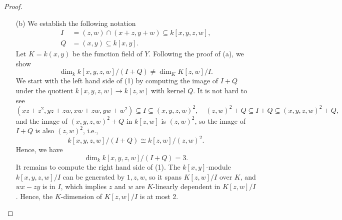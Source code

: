 \documentclass[a4paper]{article}
\begin{document}
\begin{enumerate} [label=\textbf{\arabic*.}, leftmargin=0em]
\begin{proof}
\begin{itemize} [leftmargin=0cm]
                  Since $A$ is a regular local ring, there exist $n$ elements $x_1, \dots, x_n \in A$ that form a minimal set of generators of $\goth{m}$ and an $A$-regular sequence for $A$.
                  Viewing $x_1, \dots, x_n$ as elements in $B_\goth{n}$, the elements $x_1, \dots, x_n$ generate the extension of $\goth{m}$ in $B$, so $B_\goth{n} / (x_1, \dots, x_n) \cong B_\goth{n} / \goth{m}B_\goth{n}$, which is an Artin local ring (A.M., 5.8) and has Krull dimension equal to zero.
                  Thus, $x_1, \dots, x_n$ is the desired $B_\goth{n}$-regular sequence for $B_\goth{n}$.

            \item[(b)] We establish the following notation
                  \begin{align*}
                    I & = (z, w) \cap (x + z, y + w) \subseteq k[x, y, z, w], \\
                    Q & = (x, y) \subseteq k[x, y].
                  \end{align*}
                  Let $K = k(x, y)$ be the function field of $Y$.
                  Following the proof of (a), we show
                  \begin{equation}
                    \dim_k k[x, y, z, w]/(I + Q) \neq \dim_K K[z, w]/I.
                  \end{equation}
                  We start with the left hand side of (1) by computing the image of $I + Q$ under the quotient $k[x, y, z, w] \to k[z, w]$ with kernel $Q$.
                  It is not hard to see
                  \begin{equation*}
                    (xz + z^2, yz + zw, xw + zw, yw + w^2) \subseteq I \subseteq (x, y, z, w)^2, \quad (z, w)^2 + Q \subseteq I + Q \subseteq (x, y, z, w)^2 + Q,
                  \end{equation*}
                  and the image of $(x, y, z, w)^2 + Q$ in $k[z, w]$ is $(z, w)^2$, so the image of $I + Q$ is also $(z, w)^2$, i.e.,
                  \begin{equation*}
                    k[x, y, z, w]/(I + Q) \cong k[z, w]/(z, w)^2.
                  \end{equation*}
                  Hence, we have
                  \begin{equation*}
                    \dim_k k[x, y, z, w]/(I + Q) = 3.
                  \end{equation*}
                  It remains to compute the right hand side of (1).
                  The $k[x, y]$-module $k[x, y, z, w]/I$ can be generated by $1, z, w$, so it spans $K[z, w]/I$ over $K$, and $wx - zy$ is in $I$, which implies $z$ and $w$ are $K$-linearly dependent in $K[z, w]/I$.
                  Hence, the $K$-dimension of $K[z, w]/I$ is at most 2.


\end{itemize}
\end{proof}
\end{enumerate}
\end{document}
